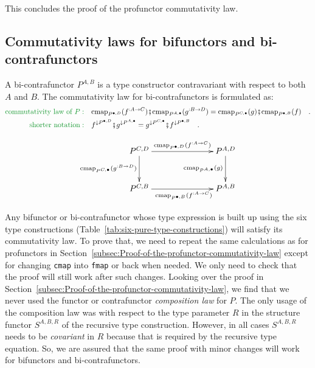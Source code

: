 This concludes the proof of the profunctor commutativity law.

\subsection{Commutativity laws for bifunctors and bi-contrafunctors\label{subsec:Proofs-of-commutativity-for-bifunctor}}

A bi-contrafunctor $P^{A,B}$ is a type constructor contravariant
with respect to both $A$ and $B$. The commutativity law for bi-contrafunctors
is formulated as:
\begin{align}
{\color{greenunder}\text{commutativity law of }P:}\quad & \text{cmap}_{P^{\bullet,D}}(f^{:A\rightarrow C})\bef\text{cmap}_{P^{A,\bullet}}(g^{:B\rightarrow D})=\text{cmap}_{P^{C,\bullet}}(g)\bef\text{cmap}_{P^{\bullet,B}}(f)\quad.\nonumber \\
{\color{greenunder}\text{shorter notation}:}\quad & f^{\downarrow P^{\bullet,D}}\bef g^{\downarrow P^{A,\bullet}}=g^{\downarrow P^{C,\bullet}}\bef f^{\downarrow P^{\bullet,B}}\quad.\label{eq:bi-contrafunctor-commutativity-law}
\end{align}

\begin{wrapfigure}{l}{0.43\columnwidth}%
\vspace{-1.7\baselineskip}
\[
\xymatrix{\xyScaleY{2.5pc}\xyScaleX{6.0pc}P^{C,D}\ar[r]\sp(0.55){\text{cmap}_{P^{\bullet,D}}(f^{:A\rightarrow C})~~~}\ar[d]\sb(0.45){\text{cmap}_{P^{C,\bullet}}(g^{:B\rightarrow D})} & P^{A,D}\ar[d]\sb(0.45){\text{cmap}_{P^{A,\bullet}}(g)}\\
P^{C,B}\ar[r]\sb(0.45){~~~~\text{cmap}_{P^{\bullet,B}}(f^{:A\rightarrow C})} & P^{A,B}
}
\]

\vspace{-1.7\baselineskip}
\end{wrapfigure}%

Any bifunctor or bi-contrafunctor whose type expression is built up
using the six type constructions (Table~\ref{tab:six-pure-type-constructions})
will satisfy its commutativity law. To prove that, we need to repeat
the same calculations as for profunctors in Section~\ref{subsec:Proof-of-the-profunctor-commutativity-law}
except for changing \lstinline!cmap! into \lstinline!fmap! or back
when needed. We only need to check that the proof will still work
after such changes. Looking over the proof in Section~\ref{subsec:Proof-of-the-profunctor-commutativity-law},
we find that we never used the functor or contrafunctor \emph{composition
law} for $P$. The only usage of the composition law was with respect
to the type parameter $R$ in the structure functor $S^{A,B,R}$ of
the recursive type construction. However, in all cases $S^{A,B,R}$
needs to be \emph{covariant} in $R$ because that is required by the
recursive type equation. So, we are assured that the same proof with
minor changes will work for bifunctors and bi-contrafunctors.


